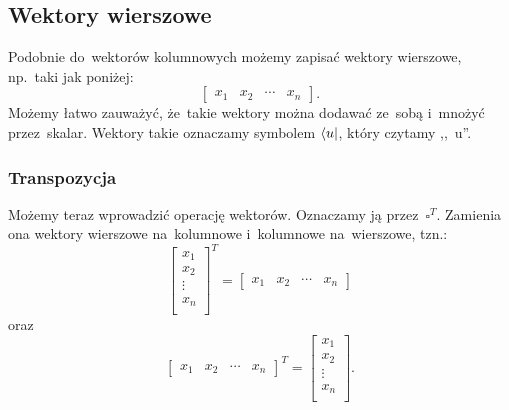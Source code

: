\subsection{Wektory wierszowe}
Podobnie do~wektorów kolumnowych możemy zapisać wektory wierszowe, np.~taki jak poniżej:
$$
	\begin{bmatrix}
		x_1    &
		x_2    &
		\cdots &
		x_{n}
	\end{bmatrix}.
$$
Możemy łatwo zauważyć, że~takie wektory można dodawać ze~sobą i~mnożyć przez~skalar.
Wektory takie oznaczamy symbolem $\bra{u}$, który czytamy ,,~u''.

\subsubsection{Transpozycja}
Możemy teraz wprowadzić operację  wektorów. Oznaczamy ją
przez~$\square^T$. Zamienia ona wektory wierszowe na~kolumnowe i~kolumnowe na~wierszowe, tzn.:
$$
	\begin{bmatrix}
		x_1    \\
		x_2    \\
		\vdots \\
		x_{n}  \\
	\end{bmatrix}^T
	=
	\begin{bmatrix}
		x_1    &
		x_2    &
		\cdots &
		x_{n}
	\end{bmatrix}
$$
oraz
$$
	\begin{bmatrix}
		x_1    &
		x_2    &
		\cdots &
		x_{n}
	\end{bmatrix}^T
	=
	\begin{bmatrix}
		x_1    \\
		x_2    \\
		\vdots \\
		x_{n}  \\
	\end{bmatrix}.
$$

